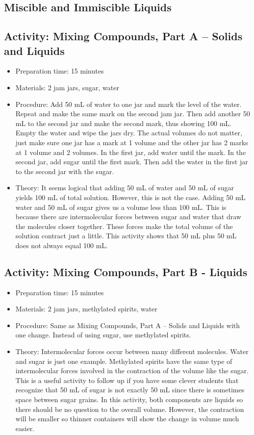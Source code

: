 \begin{itemize}
{\begin{itemize}
\begin{itemize}
{\section{Miscible and Immiscible Liquids}

\subsection{Activity: Mixing Compounds, Part A – Solids and Liquids}
\begin{itemize}
\item{Preparation time: 15 minutes}
\item{Materials: 2 jam jars, sugar, water}
\item{Procedure: Add 50 mL of water to one jar and mark the level of the water. Repeat and make the same mark on the second jam jar. Then add another 50 mL to the second jar and make the second mark, thus showing 100 mL. Empty the water and wipe the jars dry. The actual volumes do not matter, just make sure one jar has a mark at 1 volume and the other jar has 2 marks at 1 volume and 2 volumes. In the first jar, add water until the mark. In the second jar, add sugar until the first mark. Then add the water in the first jar to the second jar with the sugar. }
\item{Theory: It seems logical that adding 50 mL of water and 50 mL of sugar yields 100 mL of total solution. However, this is not the case. Adding 50 mL water and 50 mL of sugar gives us a volume less than 100 mL. This is because there are intermolecular forces between sugar and water that draw the molecules closer together. These forces make the total volume of the solution contract just a little. This activity shows that 50 mL plus 50 mL does not always equal 100 mL. }
\end{itemize}

\subsection{Activity: Mixing Compounds, Part B - Liquids}
\begin{itemize}
\item{Preparation time: 15 minutes}
\item{Materials: 2 jam jars, methylated spirits, water}
\item{Procedure: Same as Mixing Compounds, Part A – Solids and Liquids  with one change. Instead of using sugar, use methylated spirits. }
\item{Theory: Intermolecular forces occur between many different molecules. Water and sugar is just one example. Methylated spirits have the same type of intermolecular forces involved in the contraction of the volume like the sugar. This is a useful activity to follow up if you have some clever students that recognize that 50 mL of sugar is not exactly 50 mL since there is sometimes space between sugar grains. In this activity, both components are liquids so there should be no question to the overall volume. However, the contraction will be smaller so thinner containers will show the change in volume much easier.}
\end{itemize}

}
\end{itemize}
\end{itemize}}
\end{itemize}
